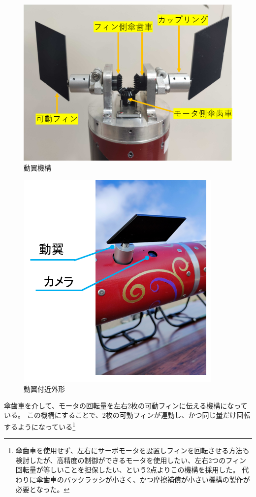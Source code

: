 \documentclass[a4paper,11pt,titlepage,uplatex]{jsarticle}
\begin{document}
\begin{figure}[H]
    \centering
    \includegraphics[scale = 0.6]{pic_str/s_r_pic.png}
    \caption{動翼機構}
    \label{s_r_pic}
\end{figure}

\begin{figure}[H]
    \centering
    \includegraphics[scale = 0.55]{pic_str/s_r_outer.png}
    \caption{動翼付近外形}
    \label{s_r_outer}
\end{figure}

傘歯車を介して、モータの回転量を左右2枚の可動フィンに伝える機構になっている。
この機構にすることで、2枚の可動フィンが連動し、かつ同じ量だけ回転するようになっている\footnote{
傘歯車を使用せず、左右にサーボモータを設置しフィンを回転させる方法も検討したが、高精度の制御ができるモータを使用したい、左右2つのフィン回転量が等しいことを担保したい、という2点よりこの機構を採用した。
代わりに傘歯車のバックラッシが小さく、かつ摩擦補償が小さい機構の製作が必要となった。}
\end{document}
